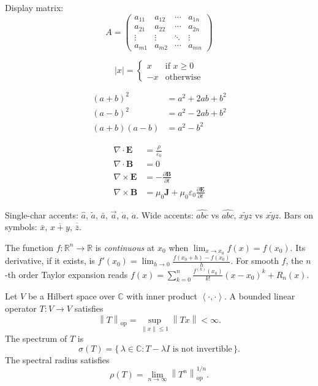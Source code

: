 \documentclass{article}
\newcommand{\R}{\mathbb{R}}
\newcommand{\C}{\mathbb{C}}
\newcommand{\norm}[1]{\left\lVert#1\right\rVert}
\newcommand{\inner}[2]{\left\langle#1,#2\right\rangle}
\newcommand{\opnorm}[1]{\norm{#1}_{\text{op}}}
\begin{document}
Display matrix:
\[
A = \begin{pmatrix}
  a_{11} & a_{12} & \cdots & a_{1n} \\
  a_{21} & a_{22} & \cdots & a_{2n} \\
  \vdots & \vdots & \ddots & \vdots \\
  a_{m1} & a_{m2} & \cdots & a_{mn}
\end{pmatrix}
\]


\[
|x| = \begin{cases}
  x  & \text{if } x \ge 0 \\
  -x & \text{otherwise}
\end{cases}
\]

\begin{align*}
  (a + b)^2 &= a^2 + 2ab + b^2 \\
  (a - b)^2 &= a^2 - 2ab + b^2 \\
  (a + b)(a - b) &= a^2 - b^2
\end{align*}

\begin{align}
  \nabla \cdot \mathbf{E} &= \frac{\rho}{\varepsilon_0} \\
  \nabla \cdot \mathbf{B} &= 0 \\
  \nabla \times \mathbf{E} &= -\frac{\partial \mathbf{B}}{\partial t} \\
  \nabla \times \mathbf{B} &= \mu_0 \mathbf{J} + \mu_0 \varepsilon_0 \frac{\partial \mathbf{E}}{\partial t}
\end{align}


Single-char accents: $\hat{a}$, $\tilde{a}$, $\bar{a}$, $\vec{a}$, $\dot{a}$,
$\ddot{a}$.
Wide accents: $\hat{abc}$ vs $\widehat{abc}$, $\tilde{xyz}$ vs $\widetilde{xyz}$.
Bars on symbols: $\bar{x}$, $\overline{x + y}$, $\overline{\overline{z}}$.


The function $f: \R^n \to \R$ is \emph{continuous} at $x_0$ when
$\lim_{x \to x_0} f(x) = f(x_0)$.  Its derivative, if it exists, is
$f'(x_0) = \lim_{h \to 0} \frac{f(x_0 + h) - f(x_0)}{h}$.  For smooth $f$,
the $n$-th order Taylor expansion reads
$f(x) = \sum_{k=0}^{n} \frac{f^{(k)}(x_0)}{k!}(x - x_0)^k + R_n(x)$.


Let $V$ be a Hilbert space over $\C$ with inner product $\inner{\cdot}{\cdot}$.
A bounded linear operator $T\colon V \to V$ satisfies
\[
\opnorm{T} = \sup_{\norm{x} \le 1} \norm{T x} < \infty.
\]
The spectrum of $T$ is
\[
\sigma(T) = \{\,\lambda \in \C : T - \lambda I \text{ is not invertible}\,\}.
\]
The spectral radius satisfies
\[
\rho(T) = \lim_{n \to \infty} \opnorm{T^n}^{1/n}.
\]
\end{document}
